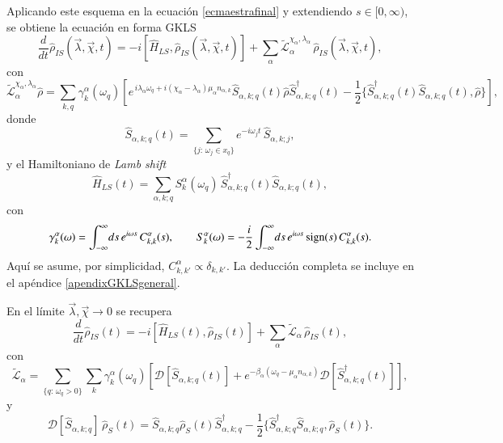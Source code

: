 Aplicando este esquema en la ecuación \eqref{ecmaestrafinal} y extendiendo \(s\in[0,\infty)\), se obtiene la ecuación en forma GKLS
\begin{equation}
    \frac{d}{dt}\hat{\rho}_{IS}(\vec{\lambda},\vec{\chi},t) 
    = -i[\hat{H}_{LS},\hat{\rho}_{IS}(\vec{\lambda},\vec{\chi},t)]
      + \sum_{\alpha}\tilde{\mathcal{L}}^{\chi_{\alpha},\lambda_{\alpha}}_{\alpha}\,
        \hat{\rho}_{IS}(\vec{\lambda},\vec{\chi},t),
    \label{ecmaestracounting}
\end{equation}
con
\begin{equation*}
    \tilde{\mathcal{L}}^{\chi_{\alpha},\lambda_{\alpha}}_{\alpha}\hat{\rho} 
    = \sum_{k,q}\gamma^{\alpha}_{k}(\omega_{q})
      \left[
        e^{\,i\lambda_{\alpha}\omega_{q} + i(\chi_{\alpha}-\lambda_{\alpha})\mu_{\alpha}n_{\alpha,k}}
        \hat{S}_{\alpha,k;q}(t)\hat{\rho}\hat{S}^{\dagger}_{\alpha,k;q}(t)
        - \frac{1}{2}\{\hat{S}^{\dagger}_{\alpha,k;q}(t)\hat{S}_{\alpha,k;q}(t),\hat{\rho}\}
      \right],
\end{equation*}
donde
\begin{equation*}
    \hat{S}_{\alpha,k;q}(t) = \sum_{\{j:\,\omega_{j}\in x_{q}\}} e^{-i\omega_{j}t}\,\hat{S}_{\alpha,k;j},
\end{equation*}
y el Hamiltoniano de \textit{Lamb shift}
\begin{equation*}
    \hat{H}_{LS}(t) = \sum_{\alpha,k;q} S^{\alpha}_{k}(\omega_{q})\,
    \hat{S}^{\dagger}_{\alpha,k;q}(t)\hat{S}_{\alpha,k;q}(t),
\end{equation*}
con
\begin{equation}
    \gamma_{k}^{\alpha}(\omega) = \int_{-\infty}^{\infty}\!ds\, e^{i\omega s}\,C^{\alpha}_{k,k}(s),
    \qquad
    S^{\alpha}_{k}(\omega) = - \frac{i}{2} \int_{-\infty}^{\infty}\!ds\, e^{i\omega s}\,\textnormal{sign}(s)\,C^{\alpha}_{k,k}(s).
    \label{sec2:gammaanddelta}
\end{equation}
Aquí se asume, por simplicidad, \(C^{\alpha}_{k,k'}\propto \delta_{k,k'}\). La deducción completa se incluye en el apéndice \ref{apendixGKLSgeneral}.

En el límite \(\vec{\lambda},\vec{\chi}\to 0\) se recupera
\begin{equation*}
    \frac{d}{dt}\hat{\rho}_{IS}(t) 
    = - i[\hat{H}_{LS}(t),\hat{\rho}_{IS}(t)] 
      + \sum_{\alpha}\tilde{\mathcal{L}}_{\alpha}\,\hat{\rho}_{IS}(t),
\end{equation*}
con
\begin{equation*}
    \tilde{\mathcal{L}}_{\alpha} 
    = \sum_{\{q:\,\omega_{q}>0\}} \sum_{k}\gamma^{\alpha}_{k}(\omega_{q})
      \left[
        \mathcal{D}[\hat{S}_{\alpha,k;q}(t)]
        + e^{-\beta_{\alpha}(\omega_{q}-\mu_{\alpha}n_{\alpha,k})}
          \mathcal{D}[\hat{S}^{\dagger}_{\alpha,k;q}(t)]
      \right],
\end{equation*}
y
\begin{equation*}
    \mathcal{D}[\hat{S}_{\alpha,k;q}]\,\hat{\rho}_{S}(t)
    = \hat{S}_{\alpha,k;q}\hat{\rho}_{S}(t)\hat{S}^{\dagger}_{\alpha,k;q}
      - \frac{1}{2}\{\hat{S}^{\dagger}_{\alpha,k;q}\hat{S}_{\alpha,k;q},\hat{\rho}_{S}(t)\}.
\end{equation*}

